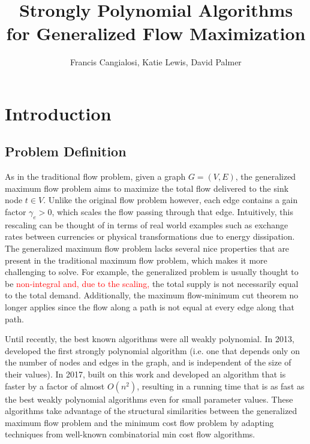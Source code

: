 \documentclass[11pt]{article}
\title{Strongly Polynomial Algorithms for Generalized Flow Maximization}
\author{Francis Cangialosi, Katie Lewis, David Palmer}
\date{}
\theoremstyle{definition}
\theoremstyle{definition}
\newcommand{\rewrite}[1]{\textcolor{red}{#1}}
\begin{document}
\maketitle
\section{Introduction}
	\subsection{Problem Definition} As in the traditional flow problem, given a graph $G = (V,E)$, the generalized maximum flow problem aims to maximize the total flow delivered to the sink node $t \in V$. Unlike the original flow problem however, each edge contains a gain factor $\gamma_e > 0$, which scales the flow passing through that edge. Intuitively, this rescaling can be thought of in terms of real world examples such as exchange rates between currencies or physical transformations due to energy dissipation. The generalized maximum flow problem lacks several nice properties that are present in the traditional maximum flow problem, which makes it more challenging to solve. For example, the generalized problem is usually thought to be \rewrite{non-integral and, due to the scaling,} the total supply is not necessarily equal to the total demand. Additionally, the maximum flow-minimum cut theorem no longer applies since the flow along a path is not equal at every edge along that path.
    
    Until recently, the best known algorithms were all weakly polynomial. In 2013, \cite{Vegh2013} developed the first strongly polynomial algorithm (i.e. one that depends only on the number of nodes and edges in the graph, and is independent of the size of their values). In 2017, \cite{Olver2017} built on this work and developed an algorithm that is faster by a factor of almost $O(n^2)$, resulting in a running time that is as fast as the best weakly polynomial algorithms even for small parameter values. These algorithms take advantage of the structural similarities between the generalized maximum flow problem and the minimum cost flow problem by adapting techniques from well-known combinatorial min cost flow algorithms.
    
\end{document}
